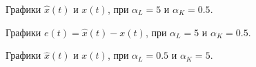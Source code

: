 \begin{figure}[!h]
\caption{Графики $\hat{x}(t)$ и $x(t)$, при $\alpha_L = 5$ и $\alpha_K = 0.5$.}
\label{4_6_50.5x}
\end{figure}

\begin{figure}[!h]
\caption{Графики $e(t) = \hat{x}(t)-x(t)$, при $\alpha_L = 5$ и $\alpha_K = 0.5$.}
\label{4_6_50.5e}
\end{figure}


\begin{figure}[!h]
\caption{Графики $\hat{x}(t)$ и $x(t)$, при $\alpha_L = 0.5$ и $\alpha_K = 5$.}
\label{4_6_0.55x}
\end{figure}

